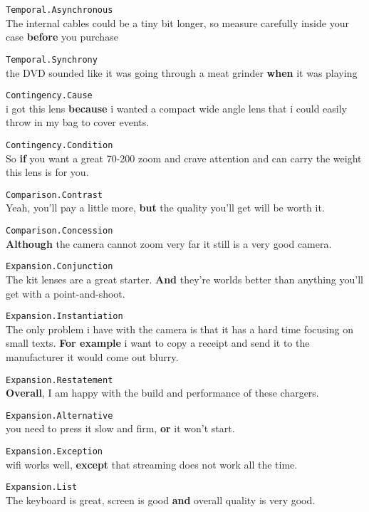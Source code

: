 \documentclass[
    a4paper,%
    12pt,%
    oneside,%
    toc=bibliography,
    final,
]{scrartcl}
\begin{document}
\begin{exe}
\ex\label{ex-pdtb-types-first} \lstinline|Temporal.Asynchronous|\\
The internal cables could be a tiny bit longer, so measure carefully inside your case \textbf{before} you purchase

\ex \lstinline|Temporal.Synchrony|\\
the DVD sounded like it was going through a meat grinder \textbf{when} it was playing

\ex \lstinline|Contingency.Cause|\\
i got this lens \textbf{because} i wanted a compact wide angle lens that i could easily throw in my bag to cover events.

\ex \lstinline|Contingency.Condition|\\
So \textbf{if} you want a great 70-200 zoom and crave attention and can carry the weight this lens is for you.

\ex \lstinline|Comparison.Contrast|\\
Yeah, you'll pay a little more, \textbf{but} the quality you'll get will be worth it.

\ex \lstinline|Comparison.Concession|\\
\textbf{Although} the camera cannot zoom very far it still is a very good camera.

\ex \lstinline|Expansion.Conjunction|\\
The kit lenses are a great starter. \textbf{And} they're worlds better than anything you'll get with a point-and-shoot.

\ex \lstinline|Expansion.Instantiation|\\
The only problem i have with the camera is that it has a hard time focusing on small texts. \textbf{For example} i want to copy a receipt and send it to the manufacturer it would come out blurry.

\ex \lstinline|Expansion.Restatement|\\
\textbf{Overall}, I am happy with the build and performance of these chargers.

\ex \lstinline|Expansion.Alternative|\\
you need to press it slow and firm, \textbf{or} it won't start.

\ex \lstinline|Expansion.Exception|\\
wifi works well, \textbf{except} that streaming does not work all the time.

\ex\label{ex-pdtb-types-last} \lstinline|Expansion.List|\\
The keyboard is great, screen is good \textbf{and} overall quality is very good.
\end{exe}
\end{document}
